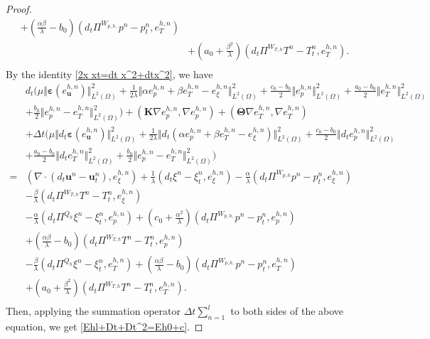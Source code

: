 \documentclass{article}
\numberwithin{equation}{section}
\begin{document}
\begin{proof}
\begin{equation}
\begin{aligned}
+(\frac{\alpha\beta}{\lambda}-b_0)(d_t\Pi^{W_{p,h,}}p^n- p_t^n,e_{T}^{h,n})\\
 &+(a_0+\frac{\beta^2}{\lambda})(d_t\Pi^{W_{T,h}}T^n - T_t^n,e_{T}^{h,n}).   
   \\
\end{aligned}
\end{equation}
 By the identity \eqref{2x xt=dt x^2+dtx^2}, we have
  \begin{equation}\label{sum dt-d/dt u xi p T}
\begin{aligned}  
&  d_t\Big(\mu\Vert\bm\varepsilon(e_{\bm u}^{h,n})\Vert_{L^2(\Omega)}^2  
  +\frac1{2\lambda} \Vert\alpha  e_p^{h,n}+\beta  e_T^{h,n}- e_\xi^{h,n}\Vert_{L^2(\Omega)}^2
  +\frac{c_0-b_0}{2} \Vert  e_p^{h,n}\Vert_{L^2(\Omega)}^2  
 +\frac{a_0-b_0}{2} \Vert  e_T^{h,n}\Vert_{L^2(\Omega)}^2 \\
&+\frac{b_0}{2} \Vert  e_p^{h,n}- e_T^{h,n}\Vert_{L^2(\Omega)}^2  \Big)
+ (\bm K \nabla  e_p^{h,n},\nabla  e_p^{h,n})
 +(\bm\Theta\nabla  e_T^{h,n},\nabla  e_T^{h,n})\\
 &+\Delta t\Big(\mu\Vert d_t\bm\varepsilon(e_{\bm u}^{h,n})\Vert_{L^2(\Omega)}^2
+\frac1{2\lambda}\Vert d_t(\alpha  e_p^{h,n}+\beta  e_T^{h,n}- e_\xi^{h,n})\Vert_{L^2(\Omega)}^2
  +\frac{c_0-b_0}{2}\Vert d_t  e_p^{h,n}\Vert_{L^2(\Omega)}^2\\
  &+\frac{a_0-b_0}{2}\Vert d_t  e_T^{h,n}\Vert_{L^2(\Omega)}^2
  +\frac{b_0}{2}\Vert  e_p^{h,n}- e_T^{h,n}\Vert_{L^2(\Omega)}^2 \Big)  \\
  =& (\nabla\cdot (d_t\bm u^n- \bm u_t^n ),e_{\xi}^{h,n})
    +\frac{1}{\lambda}(d_t\xi^n- \xi_t^n,e_{\xi}^{h,n})
   -\frac{\alpha}{\lambda}( d_t\Pi^{W_{p,h}}p^n- p_t^n,e_{\xi}^{h,n})\\
  & -\frac{\beta}{\lambda}(d_t\Pi^{W_{T,h}}T^n- T_t^n,e_{\xi}^{h,n})\\
  &-\frac\alpha\lambda(d_t\Pi^{Q_h} \xi^n- \xi_t^n ,e_{p}^{h,n})
  +(c_0+\frac{\alpha^2}{\lambda})(d_t\Pi^{W_{p,h,}}p^n- p_t^n ,e_{p}^{h,n}) \\
&+ (\frac{\alpha\beta}{\lambda}-b_0)(d_t\Pi^{W_{T,h}}T^n - T_t^n,e_{p}^{h,n})\\
  &-\frac\beta\lambda(d_t\Pi^{Q_h} \xi^n- \xi_t^n,e_{T}^{h,n})
+(\frac{\alpha\beta}{\lambda}-b_0)(d_t\Pi^{W_{p,h,}}p^n- p_t^n,e_{T}^{h,n})\\
 &+(a_0+\frac{\beta^2}{\lambda})(d_t\Pi^{W_{T,h}}T^n - T_t^n,e_{T}^{h,n}).   
   \\
\end{aligned}
\end{equation}
Then, applying the summation operator $\Delta t\sum_{n=1}^l$ to both sides of the above equation, we get \eqref{Ehl+Dt+Dt^2=Eh0+c}.
\end{proof}
\end{document}
